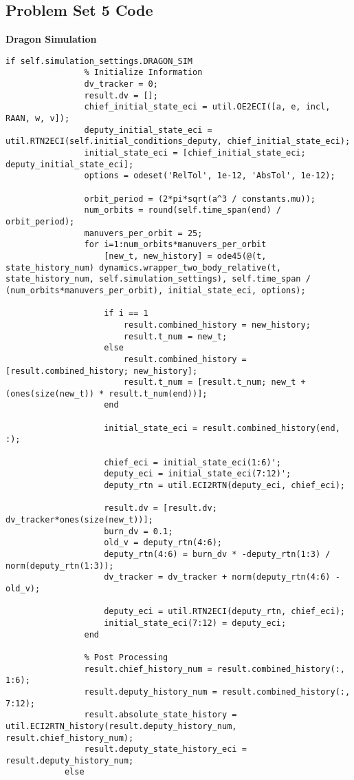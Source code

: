 \subsection{Problem Set 5 Code}

\textbf{Dragon Simulation}
\begin{lstlisting}
if self.simulation_settings.DRAGON_SIM
                % Initialize Information
                dv_tracker = 0;
                result.dv = [];
                chief_initial_state_eci = util.OE2ECI([a, e, incl, RAAN, w, v]);
                deputy_initial_state_eci = util.RTN2ECI(self.initial_conditions_deputy, chief_initial_state_eci);
                initial_state_eci = [chief_initial_state_eci; deputy_initial_state_eci];
                options = odeset('RelTol', 1e-12, 'AbsTol', 1e-12);

                orbit_period = (2*pi*sqrt(a^3 / constants.mu));
                num_orbits = round(self.time_span(end) / orbit_period);
                manuvers_per_orbit = 25;
                for i=1:num_orbits*manuvers_per_orbit
                    [new_t, new_history] = ode45(@(t, state_history_num) dynamics.wrapper_two_body_relative(t, state_history_num, self.simulation_settings), self.time_span / (num_orbits*manuvers_per_orbit), initial_state_eci, options);

                    if i == 1
                        result.combined_history = new_history;
                        result.t_num = new_t;
                    else
                        result.combined_history = [result.combined_history; new_history];
                        result.t_num = [result.t_num; new_t + (ones(size(new_t)) * result.t_num(end))];
                    end

                    initial_state_eci = result.combined_history(end, :);

                    chief_eci = initial_state_eci(1:6)';
                    deputy_eci = initial_state_eci(7:12)';
                    deputy_rtn = util.ECI2RTN(deputy_eci, chief_eci);
                    
                    result.dv = [result.dv; dv_tracker*ones(size(new_t))];
                    burn_dv = 0.1;
                    old_v = deputy_rtn(4:6);
                    deputy_rtn(4:6) = burn_dv * -deputy_rtn(1:3) / norm(deputy_rtn(1:3));
                    dv_tracker = dv_tracker + norm(deputy_rtn(4:6) - old_v);

                    deputy_eci = util.RTN2ECI(deputy_rtn, chief_eci);
                    initial_state_eci(7:12) = deputy_eci;
                end
                
                % Post Processing
                result.chief_history_num = result.combined_history(:, 1:6);
                result.deputy_history_num = result.combined_history(:, 7:12);
                result.absolute_state_history = util.ECI2RTN_history(result.deputy_history_num, result.chief_history_num);
                result.deputy_state_history_eci = result.deputy_history_num;
            else
\end{lstlisting}